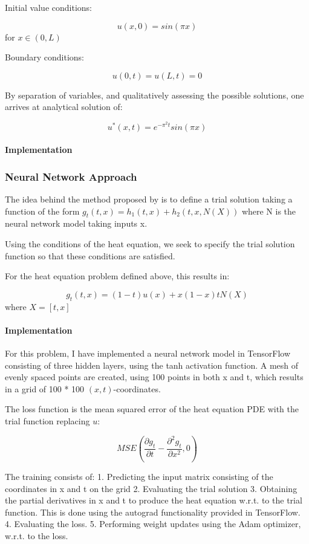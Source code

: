 \documentclass[]{article}
\let\oldparagraph\paragraph
\renewcommand{\paragraph}[1]{\oldparagraph{#1}\mbox{}}
\begin{document}
Initial value conditions:

\[u(x, 0) = sin(\pi x)\] for \(x \in (0, L)\)

Boundary conditions:

\[u(0, t) = u(L,t) = 0 \]

By separation of variables, and qualitatively assessing the possible
solutions, one arrives at analytical solution of:

\[u^*(x, t)=e^{-\pi^2 t}sin(\pi x)\]

\paragraph{Implementation}\label{implementation}

\subsubsection{Neural Network Approach}\label{neural-network-approach}

The idea behind the method proposed by \citet{Lagaris1998ArtificialNN}
is to define a trial solution taking a function of the form
\(g_t(t, x) = h_1(t, x) + h_2(t, x, N(X))\) where N is the neural
network model taking inputs x.

Using the conditions of the heat equation, we seek to specify the trial
solution function so that these conditions are satisfied.

For the heat equation problem defined above, this results in:

\[g_t(t, x) = (1 - t) u(x) + x (1 - x)t N(X)\] where \(X = [t, x]\)

\paragraph{Implementation}\label{implementation-1}

For this problem, I have implemented a neural network model in
TensorFlow consisting of three hidden layers, using the tanh activation
function. A mesh of evenly spaced points are created, using 100 points
in both x and t, which results in a grid of 100 * 100
\((x, t)\)-coordinates.

The loss function is the mean squared error of the heat equation PDE
with the trial function replacing \(u\):

\[MSE(\frac{\partial g_t}{\partial t} - \frac{\partial^2 g_t}{\partial x^2}, 0)\]

The training consists of: 1. Predicting the input matrix consisting of
the coordinates in x and t on the grid 2. Evaluating the trial solution
3. Obtaining the partial derivatives in x and t to produce the heat
equation w.r.t. to the trial function. This is done using the autograd
functionality provided in TensorFlow. 4. Evaluating the loss. 5.
Performing weight updates using the Adam optimizer, w.r.t. to the loss.
\end{document}
